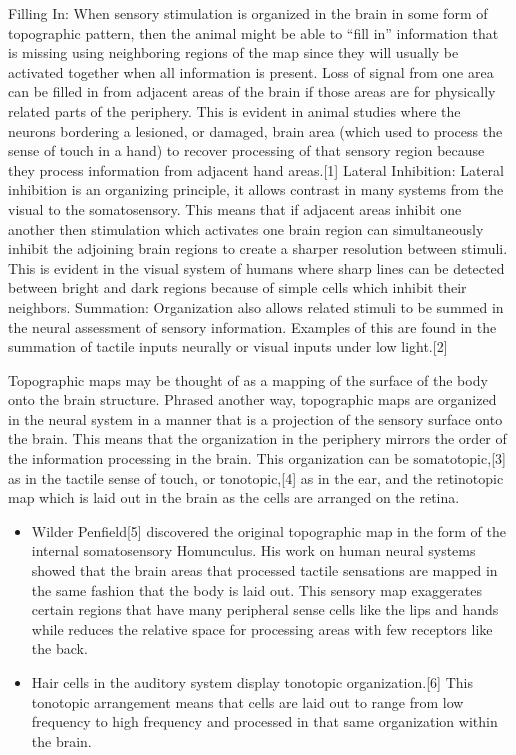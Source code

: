 Filling In: When sensory stimulation is organized in the brain in some form of topographic pattern, then the animal might be able to ``fill in'' information that is missing using neighboring regions of the map since they will usually be activated together when all information is present. Loss of signal from one area can be filled in from adjacent areas of the brain if those areas are for physically related parts of the periphery. This is evident in animal studies where the neurons bordering a lesioned, or damaged, brain area (which used to process the sense of touch in a hand) to recover processing of that sensory region because they process information from adjacent hand areas.{[}1{]}
Lateral Inhibition: Lateral inhibition is an organizing principle, it allows contrast in many systems from the visual to the somatosensory. This means that if adjacent areas inhibit one another then stimulation which activates one brain region can simultaneously inhibit the adjoining brain regions to create a sharper resolution between stimuli. This is evident in the visual system of humans where sharp lines can be detected between bright and dark regions because of simple cells which inhibit their neighbors.
Summation: Organization also allows related stimuli to be summed in the neural assessment of sensory information. Examples of this are found in the summation of tactile inputs neurally or visual inputs under low light.{[}2{]}

Topographic maps may be thought of as a mapping of the surface of the body onto the brain structure. Phrased another way, topographic maps are organized in the neural system in a manner that is a projection of the sensory surface onto the brain. This means that the organization in the periphery mirrors the order of the information processing in the brain. This organization can be somatotopic,{[}3{]} as in the tactile sense of touch, or tonotopic,{[}4{]} as in the ear, and the retinotopic map which is laid out in the brain as the cells are arranged on the retina.

\begin{itemize}
\tightlist
\item
  Wilder Penfield{[}5{]} discovered the original topographic map in the form of the internal somatosensory Homunculus. His work on human neural systems showed that the brain areas that processed tactile sensations are mapped in the same fashion that the body is laid out. This sensory map exaggerates certain regions that have many peripheral sense cells like the lips and hands while reduces the relative space for processing areas with few receptors like the back.
\item
  Hair cells in the auditory system display tonotopic organization.{[}6{]} This tonotopic arrangement means that cells are laid out to range from low frequency to high frequency and processed in that same organization within the brain.
\end{itemize}

